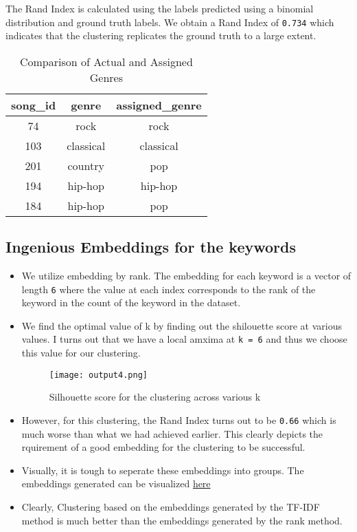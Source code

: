 \documentclass{article}
\begin{document}
The Rand Index is calculated using the labels predicted using a binomial distribution and ground truth labels. We obtain a Rand Index of \texttt{0.734} which indicates that the clustering replicates the ground truth to a large extent.

\begin{table}[h]
\centering
\begin{tabular}{|c|c|c|}
    \hline
    \textbf{song\_id} & \textbf{genre} & \textbf{assigned\_genre} \\
    \hline
    74 & rock & rock \\
    103 & classical & classical \\
    201 & country & pop \\
    194 & hip-hop & hip-hop \\
    184 & hip-hop & pop \\
    \hline
\end{tabular}
\caption{Comparison of Actual and Assigned Genres}
\label{tab:genre_comparison}
\end{table}

\subsection{Ingenious Embeddings for the keywords}
\begin{itemize}
    \item We utilize embedding by rank. The embedding for each keyword is a vector of length \texttt{6} where the value at each index corresponds to the rank of the keyword in the count of the keyword in the dataset.
    
    \item We find the optimal value of k by finding out the shilouette score at various values. I turns out that we have a local amxima at \texttt{k = 6} and thus we choose this value for our clustering.
    

    \begin{figure}[h]
    \centering
    \texttt{[image: output4.png]}
    \caption{Silhouette score for the clustering across various k}
    \label{fig:ingenious_embeddings}
    \end{figure}
    
    \item However, for this clustering, the Rand Index turns out to be \texttt{0.66} which is much worse than what we had achieved earlier. This clearly depicts the rquirement of a good embedding for the clustering to be successful.
    
    \item Visually, it is tough to seperate these embeddings into groups. The embeddings generated can be visualized \href{https://www.desmos.com/3d/xvcggpgx8i}{here}

    \item Clearly, Clustering based on the embeddings generated by the TF-IDF method is much better than the embeddings generated by the rank method.
\end{itemize}
\end{document}
